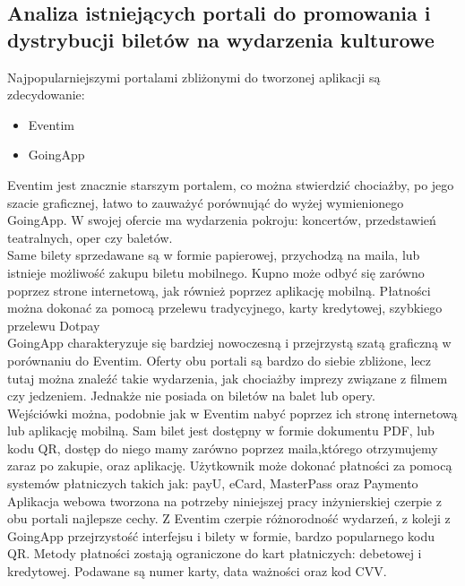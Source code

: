 \documentclass[12pt]{article}
\begin{document}
\begin{sloppypar}
{  \subsection{Analiza istniejących portali do promowania i dystrybucji biletów na wydarzenia kulturowe}
  {
    Najpopularniejszymi portalami zbliżonymi do tworzonej aplikacji są zdecydowanie:
    \begin{itemize}
      \item Eventim
      \item GoingApp
    \end{itemize}
    Eventim jest znacznie starszym portalem, co można stwierdzić chociażby, po jego szacie graficznej,
    łatwo to zauważyć porównująć do wyżej wymienionego GoingApp. 
    W swojej ofercie ma wydarzenia pokroju: koncertów, przedstawień teatralnych, oper czy baletów.\\
    Same bilety sprzedawane są w formie papierowej, przychodzą na maila, 
    lub istnieje możliwość zakupu biletu mobilnego. Kupno może odbyć się zarówno poprzez strone internetową, 
    jak również poprzez aplikację mobilną. Płatności można dokonać za pomocą przelewu tradycyjnego, karty kredytowej, szybkiego przelewu Dotpay\\
    GoingApp charakteryzuje się bardziej nowoczesną i przejrzystą szatą graficzną w porównaniu do Eventim. 
    Oferty obu portali są bardzo do siebie zbliżone, lecz tutaj można znaleźć takie wydarzenia, jak chociażby imprezy związane z filmem czy jedzeniem.
    Jednakże nie posiada on biletów na balet lub opery.\\
    Wejściówki można, podobnie jak w Eventim nabyć poprzez ich stronę internetową lub aplikację mobilną. 
    Sam bilet jest dostępny w formie dokumentu PDF, lub kodu QR, dostęp do niego mamy zarówno poprzez maila,którego otrzymujemy zaraz po zakupie, oraz aplikację.
    Użytkownik może dokonać płatności za pomocą systemów płatniczych takich jak: payU, eCard, MasterPass oraz Paymento\textregistered \\
    Aplikacja webowa tworzona na potrzeby niniejszej pracy inżynierskiej czerpie z obu portali najlepsze cechy. 
    Z Eventim czerpie różnorodność wydarzeń, z koleji z GoingApp przejrzystość interfejsu i bilety w formie, bardzo popularnego kodu QR.
    Metody płatności zostają ograniczone do kart płatniczych: debetowej i kredytowej. Podawane są numer karty, data ważności oraz kod CVV.
  }
}
\end{sloppypar}
\end{document}
